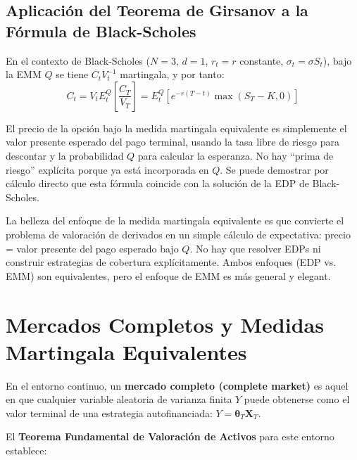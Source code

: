 \documentclass[12pt]{article}
\begin{document}
\subsection{Aplicaci\'on del Teorema de Girsanov a la F\'ormula de Black-Scholes}

En el contexto de Black-Scholes ($N = 3$, $d = 1$, $r_t = r$ constante, $\sigma_t = \sigma S_t$), bajo la EMM $Q$ se tiene $C_t V_t^{-1}$ martingala, y por tanto:
\begin{equation}
  C_t = V_t E_t^Q\!\left[\frac{C_T}{V_T}\right] = E_t^Q\!\left[e^{-r(T-t)} \max(S_T - K, 0)\right]
\end{equation}

\begin{intuicionmat}
El precio de la opci\'on bajo la medida martingala equivalente es simplemente el valor presente esperado del pago terminal, usando la tasa libre de riesgo para descontar y la probabilidad $Q$ para calcular la esperanza. No hay ``prima de riesgo'' expl\'icita porque ya est\'a incorporada en $Q$. Se puede demostrar por c\'alculo directo que esta f\'ormula coincide con la soluci\'on de la EDP de Black-Scholes.
\end{intuicionmat}

\begin{intuicion}
La belleza del enfoque de la medida martingala equivalente es que convierte el problema de valoraci\'on de derivados en un simple c\'alculo de expectativa: precio = valor presente del pago esperado bajo $Q$. No hay que resolver EDPs ni construir estrategias de cobertura expl\'icitamente. Ambos enfoques (EDP vs. EMM) son equivalentes, pero el enfoque de EMM es m\'as general y elegant.
\end{intuicion}

\section{Mercados Completos y Medidas Martingala Equivalentes}

En el entorno continuo, un \textbf{mercado completo (complete market)} es aquel en que cualquier variable aleatoria de varianza finita $Y$ puede obtenerse como el valor terminal de una estrategia autofinanciada: $Y = \boldsymbol{\theta}_T \mathbf{X}_T$.

El \textbf{Teorema Fundamental de Valoraci\'on de Activos} para este entorno establece:
\end{document}

